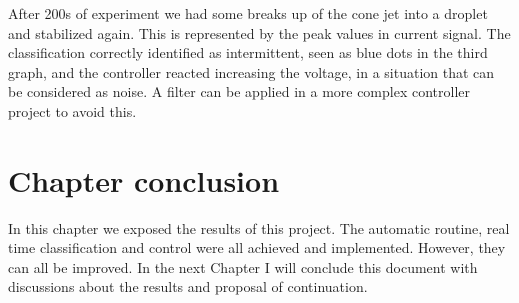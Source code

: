     After 200s of experiment we had some breaks up of the cone jet into a droplet and stabilized again. This is represented by the peak values in current signal. The classification correctly identified as intermittent, seen as blue dots in the third graph, and the controller reacted increasing the voltage, in a situation that can be considered as noise. A filter can be applied in a more complex controller project to avoid this.
    


\section{Chapter conclusion}

In this chapter we exposed the results of this project. The automatic routine, real time classification and control were all achieved and implemented. However, they can all be improved. In the next Chapter I will conclude this document with discussions about the results and proposal of continuation.


\clearpage
